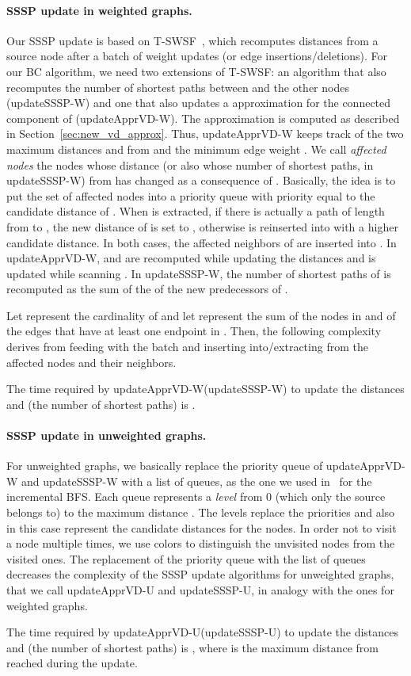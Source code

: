 \documentclass[english]{llncs}
\newcommand{\vd}{\xspace}
\newcommand{\vda}{\xspace}
\newcommand{\upvd}{\textsf{updateApprVD-W}\xspace}
\newcommand{\sssp}{\textsf{updateSSSP-W}\xspace}
\newcommand{\upvdu}{\textsf{updateApprVD-U}\xspace}
\newcommand{\ssspu}{\textsf{updateSSSP-U}\xspace}
\begin{document}
\paragraph{SSSP update in weighted graphs.}
Our SSSP update is based on \textsf{T-SWSF}~\cite{DBLP:conf/wea/BauerW09}, which recomputes distances from a source node  after a batch  of weight updates (or edge insertions/deletions). For our BC algorithm, we need two extensions of \textsf{T-SWSF}: an algorithm that also recomputes the number of shortest paths between  and the other nodes (\sssp) and one that also updates a \vd approximation for the connected component of  (\upvd). 
The \vd approximation is computed as described in Section~\ref{sec:new_vd_approx}. Thus, \upvd keeps track of the two maximum distances  and  from  and the minimum edge weight .
We call \textit{affected nodes} the nodes whose distance (or also whose number of shortest paths, in \sssp) from  has changed as a consequence of . Basically, the idea is to put the set  of affected nodes  into a priority queue  with priority  equal to the candidate distance of . When  is extracted, if there is actually a path of length  from  to , the new distance of  is set to , otherwise  is reinserted into  with a higher candidate distance. In both cases, the affected neighbors of  are inserted into . In \upvd,  and  are recomputed while updating the distances and  is updated while scanning .  In \sssp, the number  of shortest paths of  is recomputed as the sum of the  of the new predecessors  of . 

Let  represent the cardinality of  and let  represent the sum of the nodes in  and of the edges that have at least one endpoint in . Then, the following complexity derives from feeding  with the batch and inserting into/extracting from  the affected nodes and their neighbors.
\begin{lemma}
\label{thm:complexity}
The time required by \upvd (\sssp) to update the distances and \vda (the number of shortest paths) is .
\end{lemma}
\paragraph{SSSP update in unweighted graphs.}
For unweighted graphs, we basically replace the priority queue  of \upvd and \sssp with a list of queues, as the one we used in~\cite{DBLP:conf/alenex/BergaminiMS15} for the incremental BFS. Each queue represents a \emph{level} from 0 (which only the source belongs to) to the maximum distance . The levels replace the priorities and also in this case represent the candidate distances for the nodes. In order not to visit a node multiple times, we use colors to distinguish the unvisited nodes from the visited ones. The replacement of the priority queue with the list of queues decreases the complexity of the SSSP update algorithms for unweighted graphs, that we call \upvdu and \ssspu, in analogy with the ones for weighted graphs.
\begin{lemma}
\label{thm:complexity2}
The time required by \upvdu (\ssspu) to update the distances and \vda (the number of shortest paths) is , where  is the maximum distance from  reached during the update.
\end{lemma}
\end{document}
